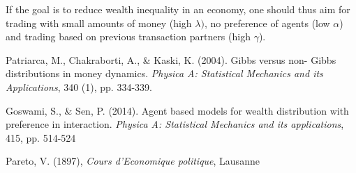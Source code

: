 \documentclass[11pt,a4paper,titlepage]{article}
\begin{document}
If the goal is to reduce wealth inequality in an economy, one should thus aim for trading with small amounts of money (high $\lambda)$, no preference of agents (low $\alpha$) and trading based on previous transaction partners (high $\gamma$).

 


 \clearpage



\begin{flushleft}
\begin{thebibliography}{}

\singlespacing
\small

  Patriarca, M., Chakraborti, A., \& Kaski, K. (2004). Gibbs versus non-
  Gibbs distributions in money dynamics. \textit{Physica A: Statistical
  Mechanics and its Applications}, 340 (1), pp. 334-339.
 
  Goswami, S., \& Sen, P. (2014). 
  Agent based models for wealth distribution with preference in interaction. 
  \textit{Physica A: Statistical Mechanics and its applications}, 415, pp. 514-524
  
  Pareto, V. (1897), \textit{Cours d'Economique politique}, Lausanne
  

  

  
\end{thebibliography}
\end{flushleft}
\end{document}
